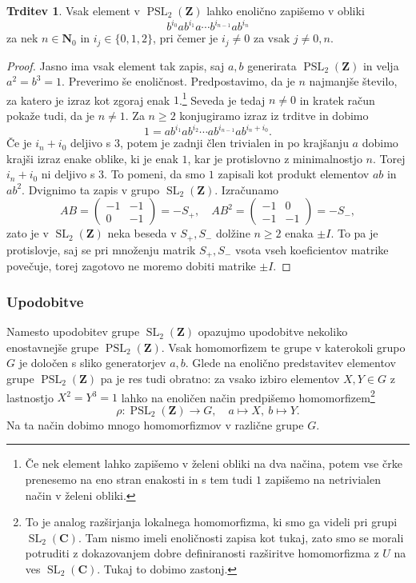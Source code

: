 \documentclass[11pt]{book}
\def\NN{\mathbf{N}}
\def\ZZ{\mathbf{Z}}
\def\CC{\mathbf{C}}
\DeclareMathOperator\SL{SL}
\DeclareMathOperator\PSL{PSL}
\theoremstyle{definition}
\theoremstyle{zgled}
\theoremstyle{zgledbrezstevilke}
\theoremstyle{odprtproblem}
\theoremstyle{domacanaloga}
\newenvironment{dokaz}
    {\color{siva}\begin{proof}}
    {\end{proof}}
\theoremstyle{izrek}
\newtheorem{trditev}[theorem]{Trditev}
\begin{document}
\begin{trditev}
Vsak element v $\PSL_2(\ZZ)$ lahko enolično zapišemo v obliki
\[
    b^{i_0} a b^{i_1} a \cdots b^{i_{n-1}} a b^{i_n}
\]
za nek $n \in \NN_0$ in $i_j \in \{0,1,2 \}$, pri čemer je $i_j \neq 0$ za vsak $j \neq 0,n$.
\end{trditev}
\begin{dokaz}
Jasno ima vsak element tak zapis, saj $a,b$ generirata $\PSL_2(\ZZ)$ in velja $a^2 = b^3 = 1$. Preverimo še enoličnost. Predpostavimo, da je $n$ najmanjše število, za katero je izraz kot zgoraj enak $1$.\footnote{Če nek element lahko zapišemo v želeni obliki na dva načina, potem vse črke prenesemo na eno stran enakosti in s tem tudi $1$ zapišemo na netrivialen način v želeni obliki.} Seveda je tedaj $n \neq 0$ in kratek račun pokaže tudi, da je $n \neq 1$. Za $n \geq 2$ konjugiramo izraz iz trditve in dobimo
\[
    1 = a b^{i_1} a b^{i_2} \cdots a b^{i_{n-1}} a b^{i_n + i_0}.
\]
Če je $i_n + i_0$ deljivo s $3$, potem je zadnji člen trivialen in po krajšanju $a$ dobimo krajši izraz enake oblike, ki je enak $1$, kar je protislovno z minimalnostjo $n$. Torej $i_n + i_0$ ni deljivo s $3$. To pomeni, da smo $1$ zapisali kot produkt elementov $ab$ in $ab^2$. Dvignimo ta zapis v grupo $\SL_2(\ZZ)$. Izračunamo
\[
    AB = \begin{pmatrix}
        -1 & -1 \\ 0 & -1
    \end{pmatrix}
    = - S_+, \quad
    AB^2 = \begin{pmatrix}
        -1 & 0 \\ -1 & -1
    \end{pmatrix}
    = - S_-,
\]
zato je v $\SL_2(\ZZ)$ neka beseda v $S_+, S_-$ dolžine $n \geq 2$ enaka $\pm I$. To pa je protislovje, saj se pri množenju matrik $S_+, S_-$ vsota vseh koeficientov matrike povečuje, torej zagotovo ne moremo dobiti matrike $\pm I$.
\end{dokaz}

\subsubsection{Upodobitve}

Namesto upodobitev grupe $\SL_2(\ZZ)$ opazujmo upodobitve nekoliko enostavnejše grupe $\PSL_2(\ZZ)$. Vsak homomorfizem te grupe v katerokoli grupo $G$ je določen s sliko generatorjev $a,b$. Glede na enolično predstavitev elementov grupe $\PSL_2(\ZZ)$ pa je res tudi obratno: za vsako izbiro elementov $X,Y \in G$ z lastnostjo $X^2 = Y^3 = 1$ lahko na enoličen način predpišemo homomorfizem\footnote{To je analog razširjanja lokalnega homomorfizma, ki smo ga videli pri grupi $\SL_2(\CC)$. Tam nismo imeli enoličnosti zapisa kot tukaj, zato smo se morali potruditi z dokazovanjem dobre definiranosti razširitve homomorfizma z $U$ na ves $\SL_2(\CC)$. Tukaj to dobimo zastonj.}
\[
    \textstyle \rho 
    \colon \PSL_2(\ZZ) \to G, \quad
    a \mapsto X, \ b \mapsto Y.
\]
Na ta način dobimo mnogo homomorfizmov v različne grupe $G$.
\end{document}

